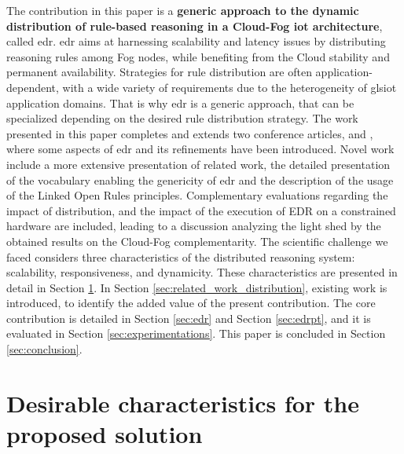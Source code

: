 \documentclass{iosart2c}
\newcommand{\edr}{EDR\xspace}
\newcommand{\Khalil}[1]{\textcolor{red}{ Khalil: \textbf{#1} }}
\begin{document}
The contribution in this paper is a \textbf{generic approach to the dynamic distribution of rule-based reasoning in a Cloud-Fog \gls{iot} architecture}, called \gls{edr}.
\gls{edr} aims at harnessing scalability and latency issues by distributing reasoning rules among Fog nodes, while benefiting from the Cloud stability and permanent availability. 
Strategies for rule distribution are often application-dependent, with a wide variety of requirements due to the heterogeneity of gls{iot} application domains.
That is why \gls{edr} is a generic approach, that can be specialized depending on the desired rule distribution strategy.
The work presented in this paper completes and extends two conference articles, \cite{wi2018} and \cite{coopis2018}, where some aspects of \gls{edr} and its refinements have been introduced.
Novel work include a more extensive presentation of related work, the detailed presentation of the vocabulary enabling the genericity of \gls{edr} and the description of the usage of the Linked Open Rules \cite{Khandelwal2011} principles. 
Complementary evaluations regarding the impact of distribution, and the impact of the execution of \edr on a constrained hardware are included, leading to a discussion analyzing the light shed by the obtained results on the Cloud-Fog complementarity. 
The scientific challenge we faced considers three characteristics of the distributed reasoning system: scalability, responsiveness, and dynamicity. 
These characteristics are presented in detail in Section \textsection \ref{sec:edr_characteristics}.
In Section \textsection \ref{sec:related_work_distribution}, existing work is introduced, to identify the added value of the present contribution.
The core contribution is detailed in Section \textsection \ref{sec:edr} and Section \textsection \ref{sec:edrpt}, and it is evaluated in Section \textsection \ref{sec:experimentations}.
This paper is concluded in Section \textsection \ref{sec:conclusion}.

\section{Desirable characteristics for the proposed solution}
\label{sec:edr_characteristics}
\end{document}
